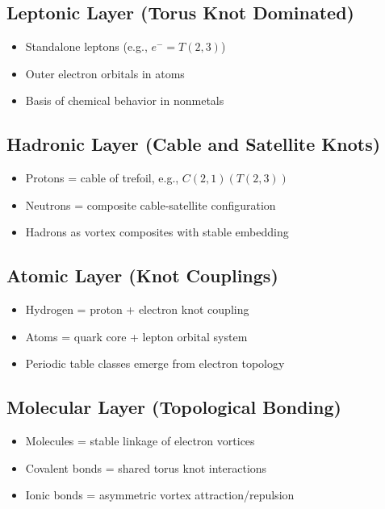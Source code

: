 \documentclass[12pt]{article}
\begin{document}
\subsection*{Leptonic Layer (Torus Knot Dominated)}
\begin{itemize}
    \item Standalone leptons (e.g., \( e^- = T(2,3) \))
    \item Outer electron orbitals in atoms
    \item Basis of chemical behavior in nonmetals
\end{itemize}

\subsection*{Hadronic Layer (Cable and Satellite Knots)}
\begin{itemize}
    \item Protons = cable of trefoil, e.g., \( C(2,1)(T(2,3)) \)
    \item Neutrons = composite cable-satellite configuration
    \item Hadrons as vortex composites with stable embedding
\end{itemize}

\subsection*{Atomic Layer (Knot Couplings)}
\begin{itemize}
    \item Hydrogen = proton + electron knot coupling
    \item Atoms = quark core + lepton orbital system
    \item Periodic table classes emerge from electron topology
\end{itemize}

\subsection*{Molecular Layer (Topological Bonding)}
\begin{itemize}
    \item Molecules = stable linkage of electron vortices
    \item Covalent bonds = shared torus knot interactions
    \item Ionic bonds = asymmetric vortex attraction/repulsion
\end{itemize}
\end{document}
